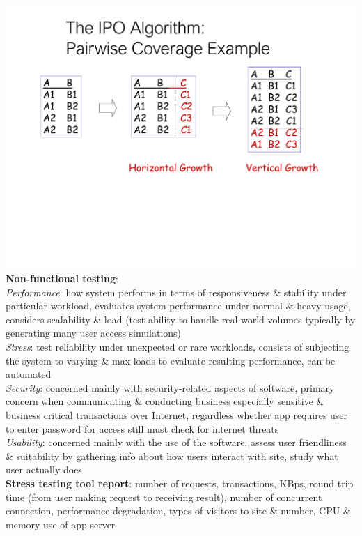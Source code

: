 \documentclass[a4paper]{article}
\begin{document}
\begin{multicols}{3}
        \includegraphics[width=\linewidth]{320.pdf}\\
        \textbf{Non-functional testing}:\\
        \textit{Performance}: how system performs in terms of responsiveness \& stability under particular workload, evaluates system performance under normal \& heavy usage, considers scalability \& load (test ability to handle real-world volumes typically by generating many user access simulations)\\
        \textit{Stress}: test reliability under unexpected or rare workloads, consists of subjecting the system to varying \& max loads to evaluate resulting performance, can be automated\\
        \textit{Security}: concerned mainly with security-related aspects of software, primary concern when communicating \& conducting business especially sensitive \& business critical transactions over Internet, regardless whether app requires user to enter password for access still must check for internet threats\\
        \textit{Usability}: concerned mainly with the use of the software, assess user friendliness \& suitability by gathering info about how users interact with site, study what user actually does\\
        \textbf{Stress testing tool report}: number of requests, transactions, KBps, round trip time (from user making request to receiving result), number of concurrent connection, performance degradation, types of visitors to site \& number, CPU \& memory use of app server\\

\end{multicols}
\end{document}
